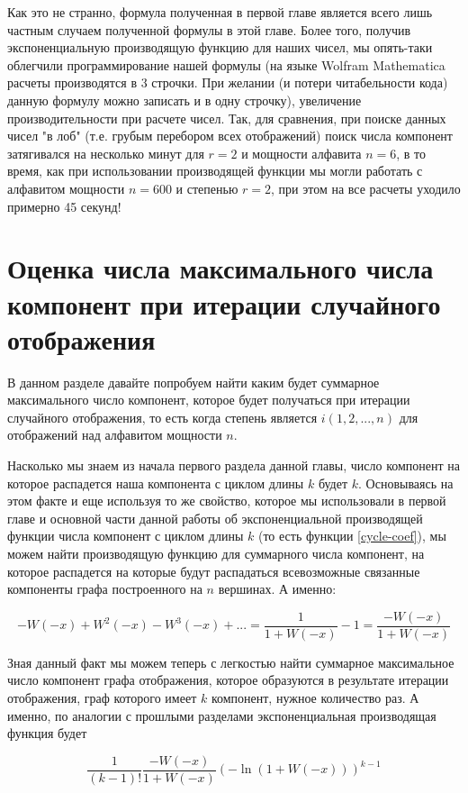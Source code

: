 \documentclass[10pt, a4paper]{report}
\renewcommand{\log}{\ln}
\begin{document}
Как это не странно, формула полученная в первой главе является всего лишь частным случаем полученной формулы в этой главе. Более того, получив экспоненциальную производящую функцию для наших чисел, мы опять-таки облегчили программирование нашей формулы (на языке Wolfram Mathematica расчеты производятся в 3 строчки. При желании (и потери читабельности кода) данную формулу можно записать и в одну строчку), увеличение производительности при расчете чисел. Так, для сравнения, при поиске данных чисел "в лоб" (т.е. грубым перебором всех отображений) поиск числа компонент затягивался на несколько минут для $r=2$ и мощности алфавита $n=6$, в то время, как при использовании производящей функции мы могли работать с алфавитом мощности $n=600$ и степенью $r=2$, при этом на все расчеты уходило примерно 45 секунд!

\section{Оценка числа максимального числа компонент при итерации случайного отображения}

В данном разделе давайте попробуем найти каким будет суммарное максимального число компонент, которое будет получаться при итерации случайного отображения, то есть когда степень является $i (1,2,...,n)$ для отображений над алфавитом мощности $n$.

Насколько мы знаем из начала первого раздела данной главы, число компонент на которое распадется наша компонента с циклом длины $k$ будет $k$. Основываясь на этом факте и еще используя то же свойство, которое мы использовали в первой главе и основной части данной работы об экспоненциальной производящей функции числа компонент с циклом длины $k$ (то есть функции \eqref{cycle-coef}), мы можем найти производящую функцию для суммарного числа компонент, на которое распадется на которые будут распадаться всевозможные связанные компоненты графа построенного на $n$ вершинах. А именно:

$$
-W(-x) +  W^2(-x) - W^3(-x) + ... = \frac{1}{1+W(-x)} - 1 = \frac{-W(-x)}{1+W(-x)}
$$

Зная данный факт мы можем теперь с легкостью найти суммарное максимальное число компонент графа отображения, которое образуются в результате итерации отображения, граф которого имеет $k$ компонент, нужное количество раз. А именно, по аналогии с прошлыми разделами экспоненциальная производящая функция будет

$$
\frac 1 {(k-1)!} \frac{-W(-x)}{1+W(-x)} (-\log(1+W(-x)))^{k-1}
$$
\end{document}
